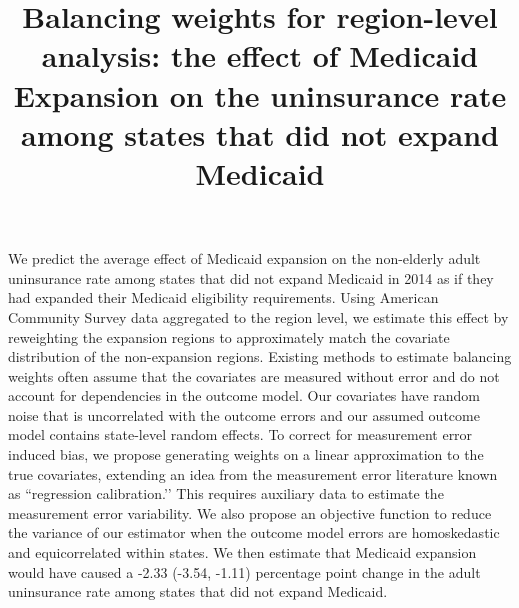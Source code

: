 \documentclass[aoas]{imsart}
\theoremstyle{plain}
\theoremstyle{remark}
\begin{document}
\begin{frontmatter}
\title{Balancing weights for region-level analysis: the effect of Medicaid Expansion on the uninsurance rate among states that did not expand Medicaid}


\begin{flushleft}
We predict the average effect of Medicaid expansion on the non-elderly adult uninsurance rate among states that did not expand Medicaid in 2014 as if they had expanded their Medicaid eligibility requirements. Using American Community Survey data aggregated to the region level, we estimate this effect by reweighting the expansion regions to approximately match the covariate distribution of the non-expansion regions. Existing methods to estimate balancing weights often assume that the covariates are measured without error and do not account for dependencies in the outcome model. Our covariates have random noise that is uncorrelated with the outcome errors and our assumed outcome model contains state-level random effects. To correct for measurement error induced bias, we propose generating weights on a linear approximation to the true covariates, extending an idea from the measurement error literature known as ``regression calibration.’’ This requires auxiliary data to estimate the measurement error variability. We also propose an objective function to reduce the variance of our estimator when the outcome model errors are homoskedastic and equicorrelated within states. We then estimate that Medicaid expansion would have caused a -2.33 (-3.54, -1.11) percentage point change in the adult uninsurance rate among states that did not expand Medicaid.
\end{flushleft}


\begin{keyword}
\end{keyword}

\end{frontmatter}
\end{document}
